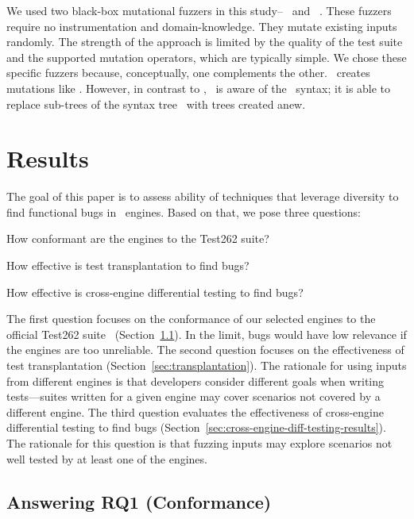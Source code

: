 \documentclass[smallextended]{svjour3}
\begin{document}
We used two black-box mutational fuzzers in this
study--\radamsa~\cite{radamsa} and \quickfuzz~\cite{quickfuzz}. These
fuzzers require no instrumentation and domain-knowledge. They mutate
existing inputs randomly. The strength of the approach is
limited by the quality of the test suite and the supported mutation
operators, which are typically simple. We chose these specific fuzzers
because, conceptually, one complements the other. \quickfuzz\ creates
mutations like \radamsa. However, in contrast to \radamsa, \quickfuzz\ is aware
of the \js\ syntax; it is able to replace sub-trees of the syntax
tree~\cite{grieco2016quickfuzz} with trees created anew.

\section{Results}
\label{sec:results}

The goal of this paper is to assess ability of techniques that
leverage diversity to find functional bugs
in \javascript\ engines. Based on that, we pose three questions:
\begin{description}[leftmargin=.5in]
\item[RQ1.] How conformant are the engines to the Test262 suite?
\item[RQ2.] How effective is test transplantation to find bugs?
\item[RQ3.] How effective is cross-engine differential testing to find bugs?
\end{description}

The first question focuses on the conformance of our selected engines
to the official Test262 suite~\cite{ecma262-conformance-suite}
(Section~\ref{sec:stability}). In the limit, bugs would have low
relevance if the engines are too unreliable. The second question
focuses on the effectiveness of test transplantation
(Section~\ref{sec:transplantation}). The rationale for using inputs
from different engines is that developers consider different goals
when writing tests---suites written for a given engine may cover
scenarios not covered by a different engine. The third question
evaluates the effectiveness of cross-engine differential testing to
find bugs (Section~\ref{sec:cross-engine-diff-testing-results}). The
rationale for this question is that fuzzing inputs may explore
scenarios not well tested by at least one of the engines.

\subsection{Answering RQ1 (Conformance)}
\label{sec:stability}
\end{document}
